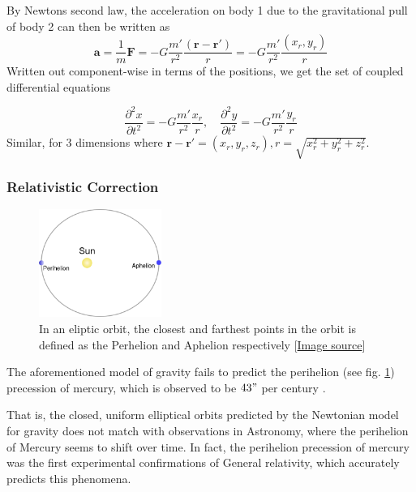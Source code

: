 \documentclass[10pt,showpacs,preprintnumbers,footinbib,amsmath,amssymb,aps,prl,twocolumn,groupedaddress,superscriptaddress,showkeys]{revtex4-1}
\begin{document}
    By Newtons second law, the acceleration on body 1 due to the gravitational pull of body 2 can then be written as
    \begin{equation}
      \mathbf a = \frac{1}{m}\mathbf F = -G \frac{m'}{r^2}\frac{(\mathbf r-\mathbf r')}{r} = -G\frac{m'}{r^2}\frac{\left(x_r, y_r\right)}{r}
    \end{equation}
    Written out component-wise in terms of the positions, we get the set of coupled differential equations

    \begin{equation}
      \frac{\partial^2 x}{\partial t^2} = -G\frac{m'}{r^2}\frac{x_r}{r}, \quad
      \frac{\partial^2 y}{\partial t^2} = -G\frac{m'}{r^2}\frac{y_r}{r}
    \end{equation}
    Similar, for 3 dimensions where $\mathbf r - \mathbf r' = (x_r, y_r, z_r), r=\sqrt{x_r^2 + y_r^2 + z_r^2}$.

    \subsubsection{Relativistic Correction}

      \begin{figure}[h!]
        \center
        \includegraphics[width=4cm]{figs/486px-Perihelion-Aphelion.png}
        \caption{In an eliptic orbit, the closest and farthest points in the orbit is defined as the Perhelion and Aphelion respectively [\href{https://en.wikipedia.org/wiki/Perihelion_and_aphelion}{Image source}]}
        \label{fig:perhelion}
      \end{figure}

      The aforementioned model of gravity fails to predict the perihelion (see fig. \ref{fig:perhelion}) precession of mercury, which is observed to be $43"$ per century \cite{problem_set}. 

      That is, the closed, uniform elliptical orbits predicted by the Newtonian model for gravity does not match with observations in Astronomy, where the perihelion of Mercury seems to shift over time. In fact, the perihelion precession of mercury was the first experimental confirmations of General relativity, which accurately predicts this phenomena.
\end{document}
